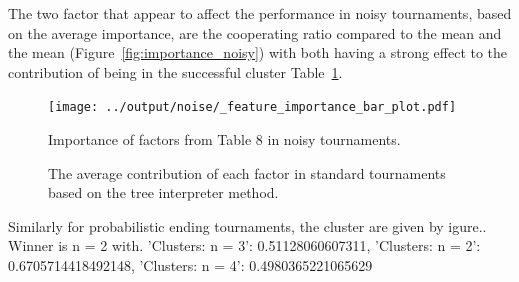 \documentclass{article}
\begin{document}
The two factor that appear to affect the performance in noisy tournaments, based on the
average importance, are the cooperating ratio compared to the mean and the mean (Figure~\ref{fig:importance_noisy})
with both having a strong effect to the contribution of being in the successful
cluster Table~\ref{table:tree_interpreter_noise}.

\begin{figure}[!htbp]
    \begin{minipage}{.6\textwidth}
    \centering
    \texttt{[image: ../output/noise/\_feature\_importance\_bar\_plot.pdf]}
    \caption{Importance of factors from Table 8 in noisy tournaments.}
    \label{fig:importance_noisy}
    \end{minipage}\hspace{.1cm}
    \begin{minipage}{.35\textwidth}
        \vspace{-1.5cm}
        \centering
        \resizebox{1.2\textwidth}{!}{
        }
        \caption{The average contribution of each factor in standard tournaments
        based on the tree interpreter method.}\label{table:tree_interpreter_noise}
    \end{minipage}
\end{figure}

Similarly for probabilistic ending tournaments, the cluster are given by igure.. Winner is n = 2 with.
'Clusters: n = 3': 0.51128060607311, 'Clusters: n = 2': 0.6705714418492148, 'Clusters: n = 4': 0.4980365221065629



\end{document}
